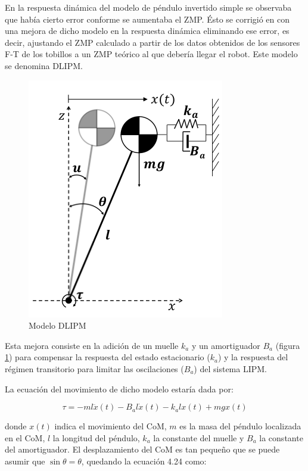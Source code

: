 En la respuesta dinámica del modelo de péndulo invertido simple se observaba que había cierto error conforme se aumentaba el ZMP. Ésto se corrigió en \cite{ref21} con una mejora de dicho modelo en la respuesta dinámica eliminando ese error, es decir, ajustando el ZMP calculado a partir de los datos obtenidos de los sensores F-T de los tobillos a un ZMP teórico al que debería llegar el robot. Este modelo se denomina DLIPM.

\begin{figure}[H]
\centering
\includegraphics[scale=0.45]{imagenes/apartado_4/45_modelo_dlipm}
\caption{Modelo DLIPM}
\label{figura45}
\end{figure}

Esta mejora consiste en la adición de un muelle $k_a$ y un amortiguador $B_a$ (figura \ref{figura45}) para compensar la respuesta del estado estacionario ($k_a$) y la respuesta del régimen transitorio para limitar las oscilaciones ($B_a$) del sistema LIPM.

La ecuación del movimiento de dicho modelo estaría dada por:

\begin{equation}
\tau = -ml\ddot{x}(t) - B_a l\dot{x}(t) - k_a lx(t) + mgx(t)
\label{ec424}
\end{equation}

donde $x(t)$ indica el movimiento del CoM, $m$ es la masa del péndulo localizada en el CoM, $l$ la longitud del péndulo, $k_a$ la constante del muelle y $B_a$ la constante del amortiguador. El desplazamiento del CoM es tan pequeño que se puede asumir que $\sin\theta = \theta$, quedando la ecuación 4.24 como:

